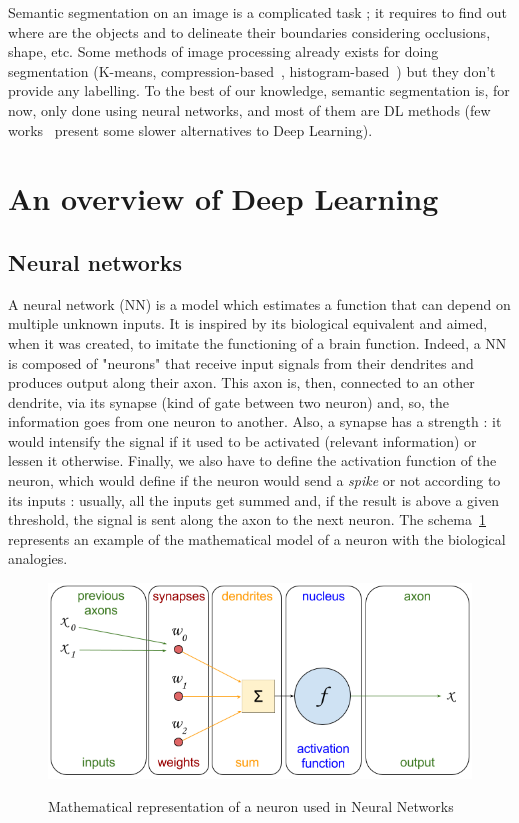 Semantic segmentation on an image is a complicated task ; it requires to find out where are the objects and to delineate their boundaries considering occlusions, shape, etc. Some methods of image processing already exists for doing segmentation (K-means, compression-based~\cite{MOBA11}, histogram-based~\cite{NI09}) but they don't provide any labelling. To the best of our knowledge, semantic segmentation is, for now, only done using neural networks, and most of them are DL methods (few works~\cite{CSUR11, KRAE11} present some slower alternatives to Deep Learning).


\section{An overview of Deep Learning} \label{1:overview}
\subsection{Neural networks}
A neural network (NN) is a model which estimates a function that can depend on multiple unknown inputs. It is inspired by its biological equivalent and aimed, when it was created, to imitate the functioning of a brain function. Indeed, a NN is composed of "neurons" that receive input signals from their dendrites and produces output along their axon. This axon is, then, connected to an other dendrite, via its synapse (kind of gate between two neuron) and, so, the information goes from one neuron to another. Also, a synapse has a strength : it would intensify the signal if it used to be activated (relevant information) or lessen it otherwise. Finally, we also have to define the activation function of the neuron, which would define if the neuron would send a \textit{spike} or not according to its inputs : usually, all the inputs get summed and, if the result is above a given threshold, the signal is sent along the axon to the next neuron.  The schema~\ref{fig:part1:neuron_schema} represents an example of the mathematical model of a neuron with the biological analogies.

\begin{figure}[ht!]
  \includegraphics[width=0.8\linewidth,center]{images/part1/neuron_schema.png}
  \caption{Mathematical representation of a neuron used in Neural Networks}\textbf{
  \label{fig:part1:neuron_schema}}
\end{figure}

